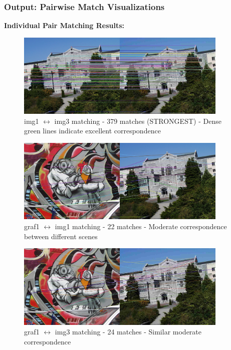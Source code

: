 \documentclass[12pt,a4paper]{article}
\begin{document}
\subsubsection{Output: Pairwise Match Visualizations}

\textbf{Individual Pair Matching Results:}

\begin{figure}[H]
\centering
\includegraphics[width=0.9\textwidth]{report/figures/gallery_results/img1__img3_matches.jpg}
\caption{img1 $\leftrightarrow$ img3 matching - 379 matches (STRONGEST) - Dense green lines indicate excellent correspondence}
\end{figure}

\begin{figure}[H]
\centering
\includegraphics[width=0.9\textwidth]{report/figures/gallery_results/graf1__img1_matches.jpg}
\caption{graf1 $\leftrightarrow$ img1 matching - 22 matches - Moderate correspondence between different scenes}
\end{figure}

\begin{figure}[H]
\centering
\includegraphics[width=0.9\textwidth]{report/figures/gallery_results/graf1__img3_matches.jpg}
\caption{graf1 $\leftrightarrow$ img3 matching - 24 matches - Similar moderate correspondence}
\end{figure}
\end{document}
